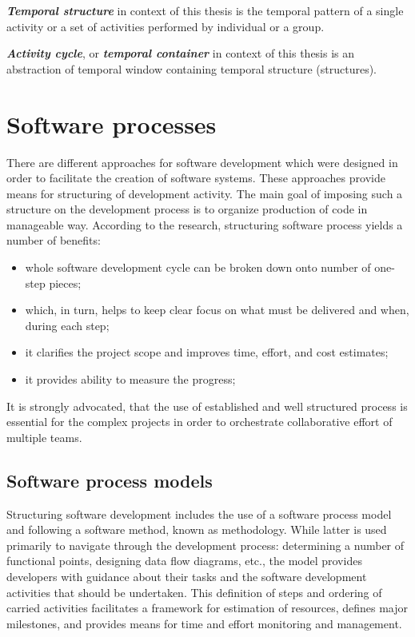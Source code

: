 \textit{\textbf{Temporal structure}} in context of this thesis is the temporal pattern of
a single activity or a set of activities performed by individual or a group. 

\textit{\textbf{Activity cycle}}, or \textit{\textbf{temporal container}} in context of 
this thesis is an abstraction of temporal window containing temporal structure (structures).

\section{Software processes}\label{software.processes}
There are different approaches for software development which were designed in order to 
facilitate the creation of software systems. These approaches provide means for 
structuring of development activity. The main goal of imposing such a structure on the 
development process is to organize production of code in manageable way. 
According to the research, structuring software process yields a number of benefits:
\begin{itemize}
 \item whole software development cycle can be broken down onto number of one-step pieces;
 \item which, in turn, helps to keep clear focus on what must be delivered and when, during each step;
 \item it clarifies the project scope and improves time, effort, and cost estimates;
 \item it provides ability to measure the progress;
\end{itemize}
It is strongly advocated, that the use of established and well structured process is 
essential for the complex projects in order to orchestrate collaborative effort 
of multiple teams. 

\subsection{Software process models}
Structuring software development includes the use of a software process model and following 
a software method, known as methodology. While latter is used primarily to navigate 
through the development process: determining a number of functional points, 
designing data flow diagrams, etc., the model provides developers with guidance about their 
tasks and the software development activities that should be undertaken. 
This definition of steps and ordering of carried activities facilitates
a framework for estimation of resources, defines major milestones, and provides 
means for time and effort monitoring and management. 

